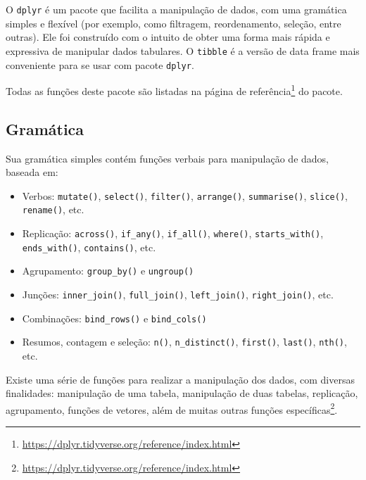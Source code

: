 \documentclass[
]{book}
\providecommand{\tightlist}{%
  \setlength{\itemsep}{0pt}\setlength{\parskip}{0pt}}
\renewcommand{\href}[2]{#2\footnote{\url{#1}}}
\begin{document}
O \texttt{dplyr} é um pacote que facilita a manipulação de dados, com uma gramática simples e flexível (por exemplo, como filtragem, reordenamento, seleção, entre outras). Ele foi construído com o intuito de obter uma forma mais rápida e expressiva de manipular dados tabulares. O \texttt{tibble} é a versão de data frame mais conveniente para se usar com pacote \texttt{dplyr}.

Todas as funções deste pacote são listadas na \href{https://dplyr.tidyverse.org/reference/index.html}{página de referência} do pacote.

\hypertarget{gramuxe1tica}{%
\subsection{Gramática}\label{gramuxe1tica}}

Sua gramática simples contém funções verbais para manipulação de dados, baseada em:

\begin{itemize}
\tightlist
\item
  Verbos: \texttt{mutate()}, \texttt{select()}, \texttt{filter()}, \texttt{arrange()}, \texttt{summarise()}, \texttt{slice()}, \texttt{rename()}, etc.
\item
  Replicação: \texttt{across()}, \texttt{if\_any()}, \texttt{if\_all()}, \texttt{where()}, \texttt{starts\_with()}, \texttt{ends\_with()}, \texttt{contains()}, etc.
\item
  Agrupamento: \texttt{group\_by()} e \texttt{ungroup()}
\item
  Junções: \texttt{inner\_join()}, \texttt{full\_join()}, \texttt{left\_join()}, \texttt{right\_join()}, etc.
\item
  Combinações: \texttt{bind\_rows()} e \texttt{bind\_cols()}
\item
  Resumos, contagem e seleção: \texttt{n()}, \texttt{n\_distinct()}, \texttt{first()}, \texttt{last()}, \texttt{nth()}, etc.
\end{itemize}

Existe uma série de funções para realizar a manipulação dos dados, com diversas finalidades: manipulação de uma tabela, manipulação de duas tabelas, replicação, agrupamento, funções de vetores, além de muitas outras \href{https://dplyr.tidyverse.org/reference/index.html}{funções específicas}.
\end{document}
